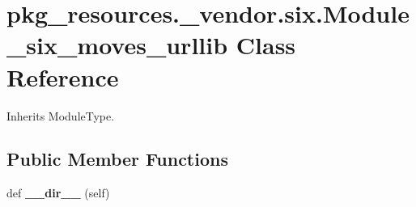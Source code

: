 \hypertarget{classpkg__resources_1_1__vendor_1_1six_1_1_module__six__moves__urllib}{}\section{pkg\+\_\+resources.\+\_\+vendor.\+six.\+Module\+\_\+six\+\_\+moves\+\_\+urllib Class Reference}
\label{classpkg__resources_1_1__vendor_1_1six_1_1_module__six__moves__urllib}


Inherits Module\+Type.

\subsection*{Public Member Functions}
\begin{DoxyCompactItemize}
\item 
\mbox{\label{classpkg__resources_1_1__vendor_1_1six_1_1_module__six__moves__urllib_a7618f9da70d53a72ae229122b7946da8}} 
def {\bfseries \+\_\+\+\_\+dir\+\_\+\+\_\+} (self)
\end{DoxyCompactItemize}
